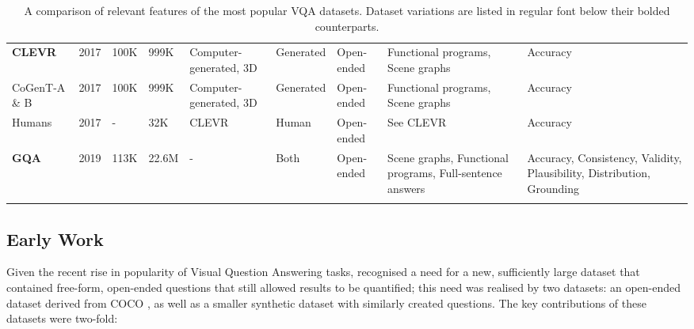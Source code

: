 \begin{landscape}
\begin{center}
\begin{xltabular}{\linewidth}{LLLLLLLLL}
      \textbf{CLEVR} \cite{johnson2017clevr}
      & 2017
      & 100K  %
      & 999K  %
      & Computer-generated, 3D
      & Generated
      & Open-ended
      & Functional programs, Scene graphs
      & Accuracy \\
      CoGenT-A \& B
      & 2017
      & 100K
      & 999K
      & Computer-generated, 3D 
      & Generated
      & Open-ended
      & Functional programs, Scene graphs
      & Accuracy \\
      Humans
      & 2017
      & -
      & 32K  %
      & CLEVR
      & Human
      & Open-ended
      & See CLEVR
      & Accuracy \\
      \textbf{GQA} \cite{hudson2019gqa}
      & 2019
      & 113K  %
      & 22.6M  %
      & -
      & Both
      & Open-ended
      & Scene graphs, Functional programs, Full-sentence answers
      & Accuracy, Consistency, Validity, Plausibility, Distribution, Grounding \\
      \bottomrule
      \caption{A comparison of relevant features of the most popular VQA datasets. Dataset variations are listed in regular font below their bolded counterparts.}
      \label{tab:dataset_comparison}
    \end{xltabular}
  \end{center}
\end{landscape}


\subsection{Early Work} 

Given the recent rise in popularity of Visual Question Answering tasks, \citeauthor{antol2015vqa} recognised a need for a new, sufficiently large dataset that contained free-form, open-ended questions that still allowed results to be quantified; this need was realised by two datasets: an open-ended dataset derived from COCO \cite{lin2014microsoft}, as well as a smaller synthetic dataset with similarly created questions.\cite{antol2015vqa} The key contributions of these datasets were two-fold:

